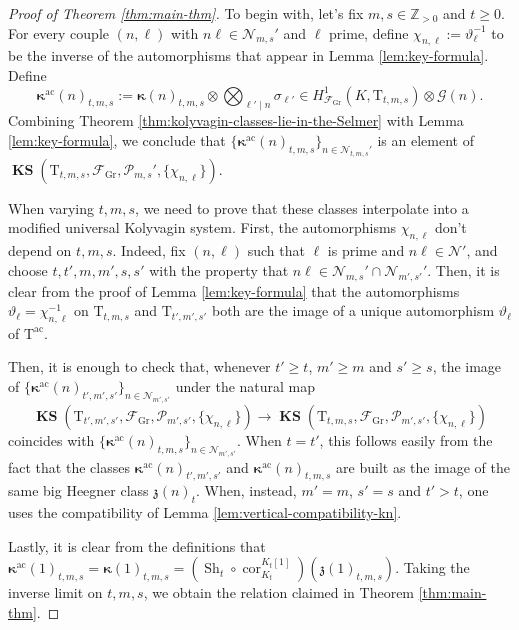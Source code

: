 \documentclass[12pt,reqno]{amsart}
\theoremstyle{definition}
\theoremstyle{remark}
\newcommand{\numberset}{\mathbb}
\newcommand{\Z}{\numberset{Z}}
\newcommand{\T}{\boldsymbol{\mathrm{T}}}
\DeclareMathOperator{\sh}{Sh}
\DeclareMathOperator{\Cor}{cor}
\DeclareMathOperator{\ks}{KS}
\newcommand{\KS}{\boldsymbol{\ks}}
\newcommand{\ac}{\mathrm{ac}}
\newcommand{\Gr}{\mathrm{Gr}}
\newcommand{\gk}{\kappa}
\newcommand{\gs}{\sigma}
\begin{document}
\begin{proof}[Proof of Theorem \ref{thm:main-thm}]
    To begin with, let's fix $m,s\in\Z_{>0}$ and $t\ge 0$. For every couple $(n,\ell)$ with $n\ell\in\mathcal{N}_{m,s}'$ and $\ell$ prime, define $\chi_{n,\ell}:=\vartheta_\ell^{-1}$ to be the inverse of the automorphisms that appear in Lemma \ref{lem:key-formula}. Define
    \begin{equation*}
        \boldsymbol{\gk}^{\ac}(n)_{t,m,s}:=\boldsymbol{\gk}(n)_{t,m,s}\otimes\bigotimes_{\ell'\mid n}\gs_{\ell'}\in H^1_{\mathcal{F}_{\Gr}}(K,\T_{t,m,s})\otimes\mathcal{G}(n).
    \end{equation*}
    Combining Theorem \ref{thm:kolyvagin-classes-lie-in-the-Selmer} with Lemma \ref{lem:key-formula}, we conclude that $\{\boldsymbol{\gk}^{\ac}(n)_{t,m,s}\}_{n\in\mathcal{N}_{t,m,s}'}$ is an element of $\KS(\T_{t,m,s},\mathcal{F}_{\Gr},\mathcal{P}_{m,s}',\{\chi_{n,\ell}\})$. 

    When varying $t,m,s$, we need to prove that these classes interpolate into a modified universal Kolyvagin system. First, the automorphisms $\chi_{n,\ell}$ don't depend on $t,m,s$. Indeed, fix $(n,\ell)$ such that $\ell$ is prime and $n\ell\in\mathcal{N}'$, and choose $t,t',m,m',s,s'$ with the property that $n\ell\in \mathcal{N}_{m,s}'\cap\mathcal{N}_{m',s'}'$. Then, it is clear from the proof of Lemma \ref{lem:key-formula} that the automorphisms $\vartheta_\ell=\chi_{n,\ell}^{-1}$ on $\T_{t,m,s}$ and $\T_{t',m',s'}$ both are the image of a unique automorphism $\vartheta_\ell$ of $\T^\ac$.
    
    
    Then, it is enough to check that, whenever $t'\ge t$, $m'\ge m$ and $s'\ge s$, the image of $\{\boldsymbol{\gk}^{\ac}(n)_{t',m',s'}\}_{n\in\mathcal{N}_{m',s'}}$ under the natural map
    \begin{equation*}
        \KS(\T_{t',m',s'},\mathcal{F}_{\Gr},\mathcal{P}_{m',s'},\{\chi_{n,\ell}\})\longrightarrow \KS(\T_{t,m,s},\mathcal{F}_{\Gr},\mathcal{P}_{m',s'},\{\chi_{n,\ell}\})
    \end{equation*}
    coincides with $\{\boldsymbol{\gk}^{\ac}(n)_{t,m,s}\}_{n\in\mathcal{N}_{m',s'}}$. When $t=t'$, this follows easily from the fact that the classes $\boldsymbol{\gk}^{\ac}(n)_{t',m',s'}$ and $\boldsymbol{\gk}^{\ac}(n)_{t,m,s}$ are built as the image of the same big Heegner class $\mathfrak{z}(n)_t$. When, instead, $m'=m$, $s'=s$ and $t'>t$, one uses the compatibility of Lemma \ref{lem:vertical-compatibility-kn}.

    Lastly, it is clear from the definitions that $\boldsymbol{\gk}^{\ac}(1)_{t,m,s}=\boldsymbol{\gk}(1)_{t,m,s}=(\sh_t\circ \Cor^{K_t[1]}_{K_t})(\mathfrak{z}(1)_{t,m,s})$. Taking the inverse limit on $t,m,s$, we obtain the relation claimed in Theorem \ref{thm:main-thm}.
\end{proof}
\end{document}
